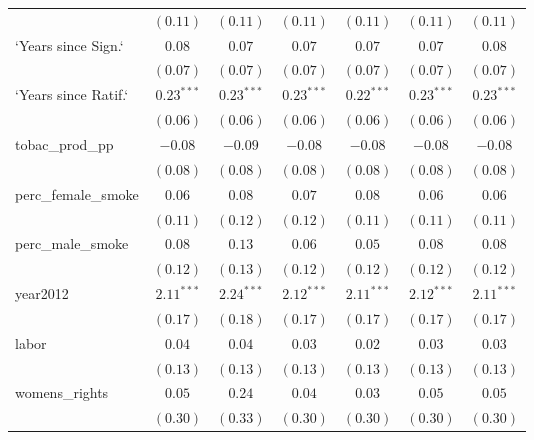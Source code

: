 \begin{table}[!h]
\begin{center}
\begin{tabular}{l c c c c c c }
                        & $(0.11)$     & $(0.11)$     & $(0.11)$     & $(0.11)$     & $(0.11)$     & $(0.11)$     \\
`Years since Sign.`     & $0.08$       & $0.07$       & $0.07$       & $0.07$       & $0.07$       & $0.08$       \\
                        & $(0.07)$     & $(0.07)$     & $(0.07)$     & $(0.07)$     & $(0.07)$     & $(0.07)$     \\
`Years since Ratif.`    & $0.23^{***}$ & $0.23^{***}$ & $0.23^{***}$ & $0.22^{***}$ & $0.23^{***}$ & $0.23^{***}$ \\
                        & $(0.06)$     & $(0.06)$     & $(0.06)$     & $(0.06)$     & $(0.06)$     & $(0.06)$     \\
tobac\_prod\_pp         & $-0.08$      & $-0.09$      & $-0.08$      & $-0.08$      & $-0.08$      & $-0.08$      \\
                        & $(0.08)$     & $(0.08)$     & $(0.08)$     & $(0.08)$     & $(0.08)$     & $(0.08)$     \\
perc\_female\_smoke     & $0.06$       & $0.08$       & $0.07$       & $0.08$       & $0.06$       & $0.06$       \\
                        & $(0.11)$     & $(0.12)$     & $(0.12)$     & $(0.11)$     & $(0.11)$     & $(0.11)$     \\
perc\_male\_smoke       & $0.08$       & $0.13$       & $0.06$       & $0.05$       & $0.08$       & $0.08$       \\
                        & $(0.12)$     & $(0.13)$     & $(0.12)$     & $(0.12)$     & $(0.12)$     & $(0.12)$     \\
year2012                & $2.11^{***}$ & $2.24^{***}$ & $2.12^{***}$ & $2.11^{***}$ & $2.12^{***}$ & $2.11^{***}$ \\
                        & $(0.17)$     & $(0.18)$     & $(0.17)$     & $(0.17)$     & $(0.17)$     & $(0.17)$     \\
labor                   & $0.04$       & $0.04$       & $0.03$       & $0.02$       & $0.03$       & $0.03$       \\
                        & $(0.13)$     & $(0.13)$     & $(0.13)$     & $(0.13)$     & $(0.13)$     & $(0.13)$     \\
womens\_rights          & $0.05$       & $0.24$       & $0.04$       & $0.03$       & $0.05$       & $0.05$       \\
                        & $(0.30)$     & $(0.33)$     & $(0.30)$     & $(0.30)$     & $(0.30)$     & $(0.30)$     \\

\end{tabular}
\end{center}
\end{table}
